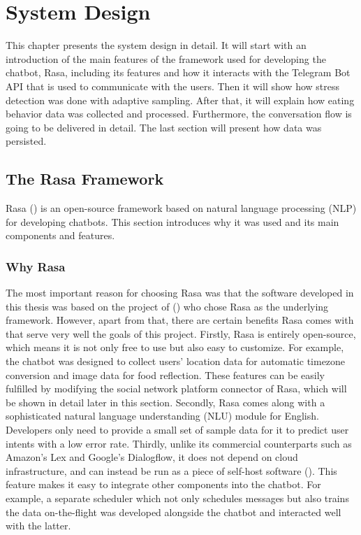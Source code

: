 
\chapter{System Design}\label{chapter:sys_design}
This chapter presents the system design in detail. It will start with an introduction of the main features of the framework used for developing the chatbot, Rasa, including its features and how it interacts with the Telegram Bot API that is used to communicate with the users. Then it will show how stress detection was done with adaptive sampling. After that, it will explain how eating behavior data was collected and processed. Furthermore, the conversation flow is going to be delivered in detail. The last section will present how data was persisted.

\section{The Rasa Framework}
Rasa (\citeyear{10_rasa}) is an open-source framework based on natural language processing (NLP) for developing chatbots. This section introduces why it was used and its main components and features.

\subsection{Why Rasa}
The most important reason for choosing Rasa was that the software developed in this thesis was based on the project of \citeauthor{17_ludwig} (\citeyear{17_ludwig}) who chose Rasa as the underlying framework. However, apart from that, there are certain benefits Rasa comes with that serve very well the goals of this project. Firstly, Rasa is entirely open-source, which means it is not only free to use but also easy to customize. For example, the chatbot was designed to collect users' location data for automatic timezone conversion and image data for food reflection. These features can be easily fulfilled by modifying the social network platform connector of Rasa, which will be shown in detail later in this section. Secondly, Rasa comes along with a sophisticated natural language understanding (NLU) module for English. Developers only need to provide a small set of sample data for it to predict user intents with a low error rate. Thirdly, unlike its commercial counterparts such as Amazon's Lex and Google's Dialogflow, it does not depend on cloud infrastructure, and can instead be run as a piece of self-host software (\cite{24_why_rasa}). This feature makes it easy to integrate other components into the chatbot. For example, a separate scheduler which not only schedules messages but also trains the data on-the-flight was developed alongside the chatbot and interacted well with the latter.

